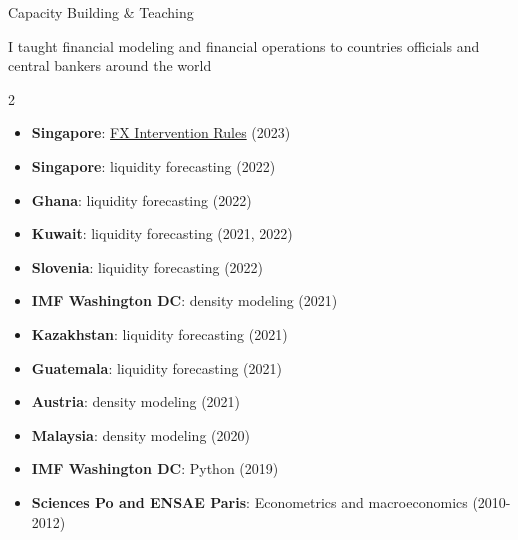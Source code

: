 \documentclass[usegeometry, 10pt, a4paper]{cv} %
\begin{document}
\begin{rubriquetableau}[0.95\textwidth]{Capacity Building \& Teaching}

  I taught financial modeling and financial operations to countries officials and central bankers around the world\\
  
  \begin{multicols}{2}
  
  \begin{itemize}
  \item \textbf{Singapore}: \href{https://romainlafarguette.github.io/fxinterventions/docs/index.html}{FX Intervention Rules} (2023)    
  \item \textbf{Singapore}: liquidity forecasting (2022)
  \item \textbf{Ghana}: liquidity forecasting (2022)
  \item \textbf{Kuwait}: liquidity forecasting (2021, 2022)
  \item \textbf{Slovenia}: liquidity forecasting (2022)
  \item \textbf{IMF Washington DC}: density modeling (2021)
  \item \textbf{Kazakhstan}: liquidity forecasting (2021)
  \item \textbf{Guatemala}: liquidity forecasting (2021)
  \item \textbf{Austria}: density modeling (2021)
  \item \textbf{Malaysia}: density modeling (2020)
  \item \textbf{IMF Washington DC}: Python (2019)
  \item \textbf{Sciences Po and ENSAE Paris}: Econometrics and macroeconomics (2010-2012)
  \end{itemize}
  
  \end{multicols}
\end{rubriquetableau}


\newpage


\end{document}
